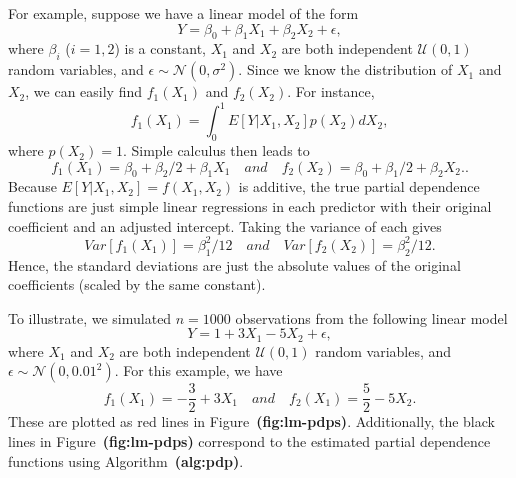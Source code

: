 \documentclass[12pt]{article}
\def\ref#1{\textbf{(#1)}}
\begin{document}
For example, suppose we have a linear model of the form
\begin{equation*}
  Y = \beta_0 + \beta_1 X_1 + \beta_2 X_2 + \epsilon,
\end{equation*}
where $\beta_i$ ($i = 1, 2$) is a constant, $X_1$ and $X_2$ are both independent $\mathcal{U}\left(0, 1\right)$ random variables, and $\epsilon \sim \mathcal{N}\left(0, \sigma ^ 2\right)$. Since we know the distribution of $X_1$ and $X_2$, we can easily find $f_1\left(X_1\right)$ and $f_2\left(X_2\right)$. For instance, 
\begin{equation*}
  f_1\left(X_1\right) = \int_0^1 E\left[Y | X_1, X_2\right] p\left(X_2\right) dX_2,
\end{equation*}
where $p\left(X_2\right) = 1$. Simple calculus then leads to 
\begin{equation*}
  f_1\left(X_1\right) = \beta_0 + \beta_2 / 2 + \beta_1 X_1 \quad and \quad f_2\left(X_2\right) = \beta_0 + \beta_1 / 2 + \beta_2 X_2..
\end{equation*}
Because $E\left[Y | X_1, X_2\right] = f\left(X_1, X_2\right)$ is additive, the true partial dependence functions are just simple linear regressions in each predictor with their original coefficient and an adjusted intercept. Taking the variance of each gives
\begin{equation*}
Var\left[f_1\left(X_1\right)\right] = \beta_1 ^ 2 / 12 \quad and \quad Var\left[f_2\left(X_2\right)\right] = \beta_2 ^ 2 / 12.
\end{equation*}
Hence, the standard deviations are just the absolute values of the original coefficients (scaled by the same constant).

To illustrate, we simulated $n = 1000$ observations from the following linear model
\begin{equation*}
  Y = 1 + 3 X_1 - 5 X_2 + \epsilon,
\end{equation*}
where $X_1$ and $X_2$ are both independent $\mathcal{U}\left(0, 1\right)$ random variables, and $\epsilon \sim \mathcal{N}\left(0, 0.01 ^ 2\right)$. For this example, we have 
\begin{equation*}
  f_1\left(X_1\right) = -\frac{3}{2} + 3 X_1 \quad and \quad f_2\left(X_1\right) = \frac{5}{2} - 5 X_2.
\end{equation*}
These are plotted as red lines in Figure~\ref{fig:lm-pdps}. Additionally, the black lines in Figure~\ref{fig:lm-pdps} correspond to the estimated partial dependence functions using Algorithm~\ref{alg:pdp}.
\end{document}

